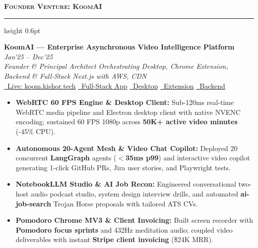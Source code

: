 \documentclass[10pt,a4paper]{article}
\newcommand{\resumesection}[1]{%
    \vspace{2.2pt}%
    {\color{burgundy}\scshape\bfseries\fontsize{9.0pt}{10.2pt}\selectfont #1}%
    \vspace{0.6pt}%
    \hrule height 0.6pt\relax%
    \vspace{1.6pt}%
}
\begin{document}
\begin{minipage}[t]{0.488\textwidth}
    \resumesection{Founder Venture: KoomAI}
    \noindent\textbf{KoomAI — Enterprise Asynchronous Video Intelligence Platform} \hfill {\footnotesize\textit{Jan'25 -- Dec'25}}\\
    \textit{Founder \& Principal Architect \;\textbar\; Orchestrating Desktop, Chrome Extension, Backend \& Full-Stack Next.js with AWS, CDN}\\
    \href{https://koom.kishor.tech/}{\faExternalLink*\ Live: koom.kishor.tech} \href{https://github.com/KishorKumarParoi/Koom-AI}{\faGithub\ Full-Stack App} \href{https://github.com/KishorKumarParoi/Koom-ai-desktop}{\faDesktop\ Desktop} \href{https://github.com/KishorKumarParoi/Koom-AI-Chrome-Extension}{\faChrome\ Extension} \href{https://github.com/KishorKumarParoi/koom-ai-express}{\faServer\ Backend}
    \begin{itemize}
        \item \textbf{WebRTC 60 FPS Engine \& Desktop Client:} Sub-120ms real-time WebRTC media pipeline and Electron desktop client with native NVENC encoding; sustained 60 FPS 1080p across \textbf{50K+ active video minutes} (-45\% CPU).
        \item \textbf{Autonomous 20-Agent Mesh \& Video Chat Copilot:} Deployed 20 concurrent \textbf{LangGraph} agents (\textbf{$<$35ms p99}) and interactive video copilot generating 1-click GitHub PRs, Jira user stories, and Playwright tests.
        \item \textbf{NotebookLLM Studio \& AI Job Recon:} Engineered conversational two-host audio podcast studio, system design interview drills, and automated \textbf{ai-job-search} Trojan Horse proposals with tailored ATS CVs.
        \item \textbf{Pomodoro Chrome MV3 \& Client Invoicing:} Built screen recorder with \textbf{Pomodoro focus sprints} and 432Hz meditation audio; coupled video deliverables with instant \textbf{Stripe client invoicing} (\$24K MRR).
    \end{itemize}


\end{minipage}
\end{document}
